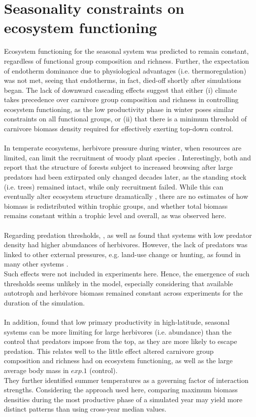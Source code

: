 \section{Seasonality constraints on ecosystem functioning}
Ecosystem functioning for the seasonal system was predicted to remain constant, regardless of functional group composition and richness. Further, the expectation of endotherm dominance due to physiological advantages (i.e. thermoregulation) was not met, seeing that endotherms, in fact, died-off shortly after simulations began. The lack of downward cascading effects suggest that either (i) climate takes precedence over carnivore group composition and richness in controlling ecosystem functioning, as the low productivity phase in winter poses similar constraints on all functional groups, or (ii) that there is a minimum threshold of carnivore biomass density required for effectively exerting top-down control.\\\\
In temperate ecosystems, herbivore pressure during winter, when resources are limited, can limit the recruitment of woody plant species \citep{Ripple2014}.
Interestingly, both \cite{Casabon2007} and \citep{Beschta2009} report that the structure of forests subject to increased browsing after large predators had been extirpated only changed decades later, as the standing stock (i.e. trees) remained intact, while only recruitment failed.
While this can eventually alter ecosystem structure dramatically \citep{Terborgh2001, Estes2011}, there are no estimates of how biomass is redistributed within trophic groups, and whether total biomass remains constant within a trophic level and overall, as was observed here. \\\\
Regarding predation thresholds, \cite{Ripple2012}, as well as \cite{Johnson2009} found that systems with low predator density had higher abundances of herbivores. However, the lack of predators was linked to other external pressures, e.g. land-use change or hunting, as found in many other systems \citep{Estes2011,Ripple2014}. \\
Such effects were not included in experiments here. Hence, the emergence of such thresholds seems unlikely in the model, especially considering that available autotroph and herbivore biomass remained constant across experiments for the duration of the simulation.  \\\\
In addition,  \cite{Legagneux2014} found that low primary productivity in high-latitude, seasonal systems can be more limiting for large herbivores (i.e. abundance) than the control that predators impose from the top, as they are more likely to escape predation. 
This relates well to the little effect altered carnivore group composition and richness had on ecosystem functioning, as well as the large average body mass in $exp. 1$ (control). \\
They further identified summer temperatures as a governing factor of interaction strengths. Considering the approach used here, comparing maximum biomass densities during the most productive phase of a simulated year may yield more distinct patterns than using cross-year median values.
